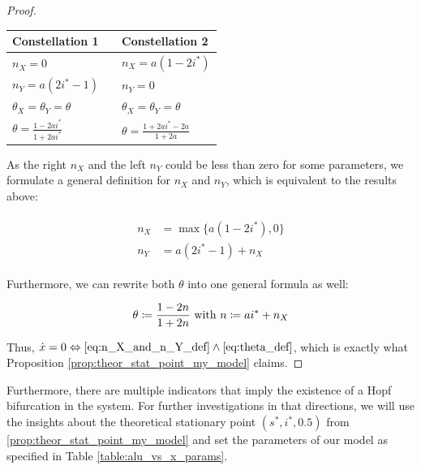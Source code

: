 \documentclass[12pt,a4paper,twoside]{article}
\begin{document}
\begin{proof}
	\begin{table}[h!]
	\centering
		\begin{tabular}{lll}
			Constellation 1 & & Constellation 2\\
			\hline
			$n_X = 0$ && $n_X = a(1-2i^*)$\\
			$n_Y = a(2i^*-1)$ && $n_Y = 0$ \\
			$\theta_X = \theta_Y = \theta$ && $\theta_X = \theta_Y = \theta$\\
			$\theta = \frac{1-2ai^*}{1+2ai^*}$ && $\theta = \frac{1+2ai^*-2a}{1+2a}$\\
		\end{tabular}
	\end{table}
	
	As the right $n_X$ and the left $n_Y$ could be less than zero for some parameters, we formulate a general definition for $n_X$ and $n_Y$, which is equivalent to the results above:
	
	\begin{align}\label{eq:n_X_and_n_Y_def}
	\begin{split}
		n_X &= \max \lbrace a\left(1-2i^*\right), 0\rbrace\\
		n_Y & = a\left(2i^* - 1\right) + n_X
		\end{split}
	\end{align}
	
	Furthermore, we can rewrite both $\theta$ into one general formula as well:
	
	\begin{equation}\label{eq:theta_def}
		\theta \coloneqq \frac{1-2n}{1+2n} \textnormal{ with }n \coloneqq ai^* + n_X
	\end{equation}
	
	Thus, $\dot{x} = 0 \Leftrightarrow \eqref{eq:n_X_and_n_Y_def} \land \eqref{eq:theta_def}$, which is exactly what Proposition \ref{prop:theor_stat_point_my_model} claims.
\end{proof}

Furthermore, there are multiple indicators that imply the existence of a Hopf bifurcation in the system. For further investigations in that directions, we will use the insights about the theoretical stationary point $\left(s^*, i^*, 0.5\right)$ from \eqref{prop:theor_stat_point_my_model} and set the parameters of our model as specified in Table \ref{table:alu_vs_x_params}.
\end{document}
